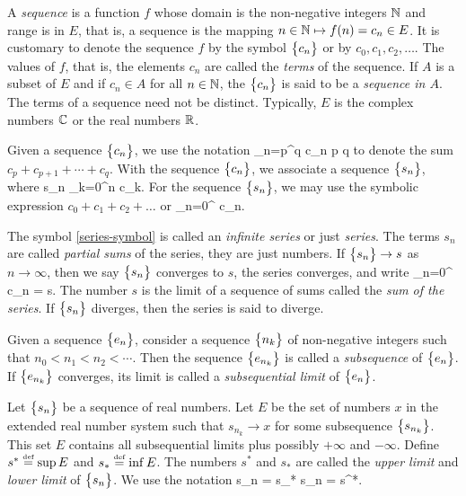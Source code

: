 \documentclass[12pt]{article}
\begin{document}
A {\it sequence} is a function $f$ whose domain is the non-negative integers $\mathbb{N}$
and range is in $E$, that is, a sequence is the mapping $n \in \mathbb{N} \mapsto f(n) = c_n \in E$. It is customary
to denote the sequence $f$ by the symbol $\bigl\{ {c_n} \bigr\}$ or by $c_0, c_1, c_2, \ldots$.
The values of $f$, that is, the elements $c_n$ are called the {\it terms} of the sequence.
If $A$ is a subset of $E$ and if $c_n \in A$ for all $n \in \mathbb{N}$, the $\bigl\{ {c_n} \bigr\}$ is said to be
a {\it sequence in $A$}. The terms of a sequence need not be distinct. Typically, $E$ is
the complex numbers $\mathbb{C}$ or the real numbers $\mathbb{R}$.

Given a sequence $\bigl\{ {c_n} \bigr\}$, we use the notation
\EQ
{
  \sum_{n=p}^q c_n \qquad{}\qquad p \leq q
}
to denote the sum $c_p + c_{p+1} + \cdots + c_q$. With the sequence $\bigl\{ {c_n} \bigr\}$, we associate a sequence
$\bigl\{ {s_n} \bigr\}$, where
\EQ
{
  \label{eq:partial-sum}
  s_n  \sum_{k=0}^n c_k.
}
For the sequence $\bigl\{ {s_n} \bigr\}$, we may use the symbolic expression $c_0 + c_1 + c_2 + \ldots$ or
\EQ
{
  \label{eq:series-symbol}
  \sum_{n=0}^{\infty} c_n.
}

The symbol \eqref{series-symbol} is called an {\it infinite series} or just {\it series}. The
terms $s_n$ are called {\it partial sums} of the series, they are just numbers.
If $\bigl\{ {s_n} \bigr\} \rightarrow s$ as $n \rightarrow \infty$, then we say $\bigl\{ {s_n} \bigr\}$ converges to $s$,
the series converges, and write
\EQ
{
  \label{eq:series-limit}
  \sum_{n=0}^{\infty} c_n = s.
}
The number $s$ is the limit of a sequence of sums called the {\it sum of the series}. If $\bigl\{ {s_n} \bigr\}$
diverges, then the series is said to diverge.

Given a sequence $\bigl\{ {e_n} \bigr\}$, consider a sequence $\bigl\{ {n_k} \bigr\}$ of non-negative integers such that
$n_0 < n_1 < n_2 < \cdots$. Then the sequence $\bigl\{ {e_{n_k}} \bigr\}$ is called a {\it subsequence} of
$\bigl\{ {e_n} \bigr\}$. If $\bigl\{ {e_{n_k}} \bigr\}$ converges, its limit is called a {\it subsequential limit} of $\bigl\{ {e_n} \bigr\}$.

Let $\bigl\{ {s_n} \bigr\}$ be a sequence of real numbers. Let $E$ be the set of numbers $x$ in the extended real number
system such that $s_{n_k} \rightarrow x$ for some subsequence $\bigl\{ {s_{n_k}} \bigr\}$.
This set $E$ contains all subsequential limits plus possibly $+\infty$ and $-\infty$. Define $s^* \stackrel{\textup{\tiny def}}{=} \sup E$ and
$s_* \stackrel{\textup{\tiny def}}{=} \inf E$. The numbers $s^*$ and $s_*$ are called the {\it upper limit} and {\it lower limit}
of $\bigl\{ {s_n} \bigr\}$. We use the notation
\EQ
{
   s_n = s_* \qquad{}\qquad {} s_n = s^*.
}
\end{document}
